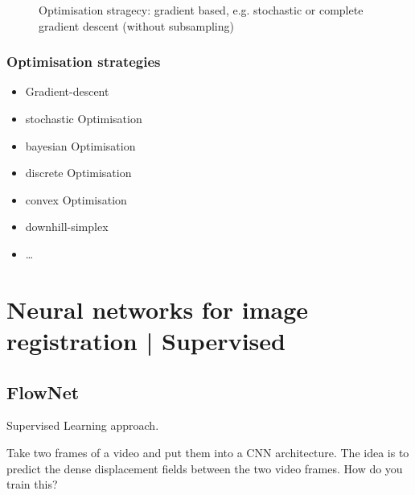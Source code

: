 \documentclass[11pt]{article}
\begin{document}
\begin{figure}[H]
    \centering
    \caption*{Optimisation stragecy: gradient based, e.g. stochastic or complete gradient descent (without subsampling)}
\end{figure}

\subsubsection{Optimisation strategies}

\begin{itemize}
    \item Gradient-descent
    \item stochastic Optimisation
    \item bayesian Optimisation
    \item discrete Optimisation
    \item convex Optimisation
    \item downhill-simplex
    \item \dots
\end{itemize}

\section{Neural networks for image registration | Supervised}

\subsection{FlowNet}

Supervised Learning approach.

\begin{figure}[H]
    \centering
\end{figure}

Take two frames of a video and put them into a CNN architecture. The idea is to predict the dense displacement fields between the two video frames. How do you train this?

\begin{figure}[H]
    \centering
\end{figure}
\end{document}
